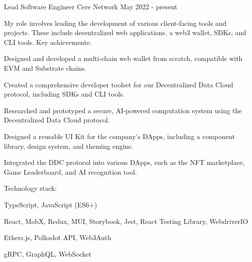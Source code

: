 

\begin{cventries}


  \cventry
    {Lead Software Engineer} %
    {Cere Network} %
    {} %
    {May 2022 - present} %
    {
      My role involves leading the development of various client-facing tools and projects. These include decentralized web applications, a web3 wallet, SDKs, and CLI tools.
      \newline
      \vspace{2mm}
      Key achievements:
      \vspace{4mm}
      \begin{cvitems}
        \item Designed and developed a multi-chain web wallet from scratch, compatible with EVM and Substrate chains.
        \item Created a comprehensive developer toolset for our Decentralized Data Cloud protocol, including SDKs and CLI tools.
        \item Researched and prototyped a secure, AI-powered computation system using the Decentralized Data Cloud protocol.
        \item Designed a reusable UI Kit for the company's DApps, including a component library, design system, and theming engine.
        \item Integrated the DDC protocol into various DApps, such as the NFT marketplace, Game Leaderboard, and AI recognition tool.
      \end{cvitems}
      \vspace{5mm}
      Technology stack:
      \begin{cvstackitems}
        \item TypeScript, JavaScript (ES6+)
        \item React, MobX, Redux, MUI, Storybook, Jest, React Testing Library, WebdriverIO
        \item Ethers.js, Polkadot API, Web3Auth
        \item gRPC, GraphQL, WebSocket
      \end{cvstackitems}
    }


\end{cventries}
